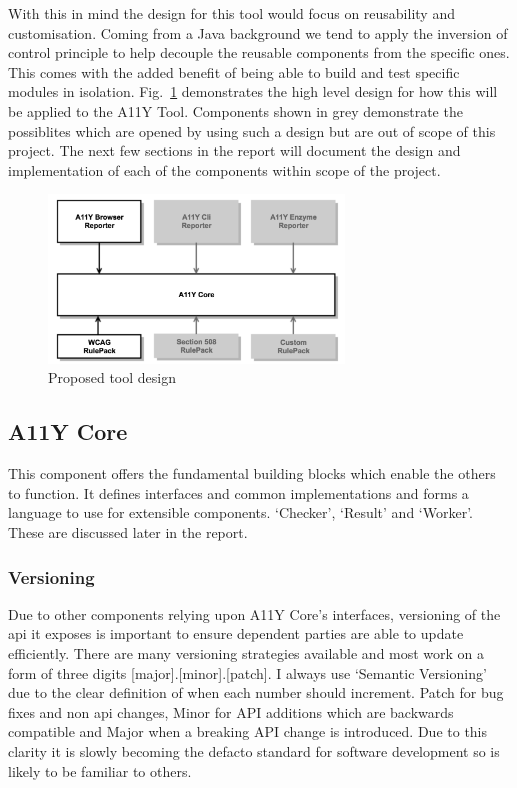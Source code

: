 With this in mind the design for this tool would focus on reusability and
customisation. Coming from a Java background we tend to apply the inversion
of control principle \citep{DRC} to help decouple the reusable components from
the specific ones. This comes with the added benefit of being able to build
and test specific modules in isolation.
Fig.~\ref{fig:tool_proposed_design} demonstrates the high level design for
how this will be applied to the A11Y Tool. Components shown in grey demonstrate
the possiblites which are opened by using such a design but are out of scope
of this project. The next few sections in the report will document the design
and implementation of each of the components within scope of the project.

\begin{figure}[H]
\centering
\includegraphics[width=0.7\textwidth]{figures/a11y_tool_proposed_design}
\captionsetup{justification=centering}
\caption{Proposed tool design
\label{fig:tool_proposed_design}}
\end{figure}

\subsection{A11Y Core}
This component offers the fundamental building blocks which enable the
others to function. It defines interfaces and common implementations and
forms a language to use for extensible components. `Checker', `Result' and
`Worker'. These are discussed later in the report.

\subsubsection{Versioning}
Due to other components relying upon A11Y Core's interfaces, versioning of
the api it exposes is important to ensure dependent parties are able to update
efficiently. There are many versioning strategies available and most work on
a form of three digits [major].[minor].[patch]. I always use `Semantic
Versioning' \citep{Semver} due to the clear definition of when each number should
increment.
Patch for bug fixes and non api changes, Minor for API additions which are
backwards compatible and Major when a breaking API change is introduced. Due to this
clarity it is slowly becoming the defacto standard for software development
so is likely to be familiar to others.

